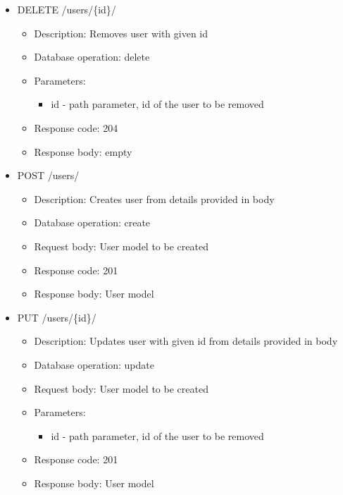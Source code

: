 \begin{itemize}
\begin{itemize}
          \end{itemize}
    \item DELETE /users/\{id\}/
          \begin{itemize}
              \item Description: Removes user with given id
              \item Database operation: delete
              \item Parameters:
                    \begin{itemize}
                        \item id - path parameter, id of the user to be removed
                    \end{itemize}
              \item Response code: 204
              \item Response body: empty
          \end{itemize}
    \item POST /users/
          \begin{itemize}
              \item Description: Creates user from details provided in body
              \item Database operation: create
              \item Request body: User model to be created
              \item Response code: 201
              \item Response body: User model
          \end{itemize}
    \item PUT /users/\{id\}/
          \begin{itemize}
              \item Description: Updates user with given id from details provided in body
              \item Database operation: update
              \item Request body: User model to be created
              \item Parameters:
                    \begin{itemize}
                        \item id - path parameter, id of the user to be removed
                    \end{itemize}
              \item Response code: 201
              \item Response body: User model
          \end{itemize}
\end{itemize}

